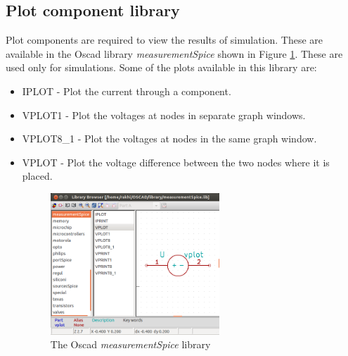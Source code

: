 \subsection{Plot component library}
Plot components are required to view the results of simulation. These are available in the Oscad library \textit{measurementSpice} shown in Figure \ref{measspice}. These are used only for simulations. Some of the plots available in this library are:
\begin{itemize}
\item IPLOT - Plot the current through a component.
\item VPLOT1 - Plot the voltages at nodes in separate graph windows. 
\item VPLOT8\_1 - Plot the voltages at nodes in the same graph window.
\item VPLOT - Plot the voltage difference between the two nodes where it is placed. 
\begin{figure}
\centering
\includegraphics[width=0.6\textwidth]{figures/measspice}
\caption{The Oscad \textit{measurementSpice} library}
\label{measspice}
\end{figure}
\end{itemize}
